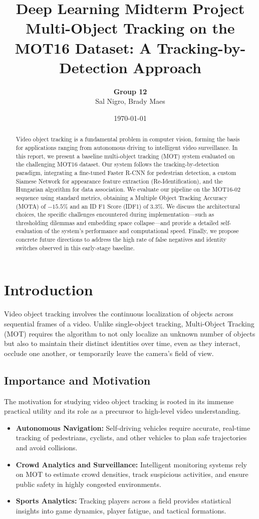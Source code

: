 \documentclass[11pt, letterpaper]{article}
\title{\textbf{Deep Learning Midterm Project}\\Multi-Object Tracking on the MOT16 Dataset: A Tracking-by-Detection Approach}
\author{\textbf{Group 12} \\ Sal Nigro, Brady Maes}
\date{\today}
\begin{document}
\maketitle

\begin{abstract}
Video object tracking is a fundamental problem in computer vision, forming the basis for applications ranging from autonomous driving to intelligent video surveillance. In this report, we present a baseline multi-object tracking (MOT) system evaluated on the challenging MOT16 dataset. Our system follows the tracking-by-detection paradigm, integrating a fine-tuned Faster R-CNN for pedestrian detection, a custom Siamese Network for appearance feature extraction (Re-Identification), and the Hungarian algorithm for data association. We evaluate our pipeline on the MOT16-02 sequence using standard metrics, obtaining a Multiple Object Tracking Accuracy (MOTA) of $-15.5\%$ and an ID F1 Score (IDF1) of $3.3\%$. We discuss the architectural choices, the specific challenges encountered during implementation—such as thresholding dilemmas and embedding space collapse—and provide a detailed self-evaluation of the system's performance and computational speed. Finally, we propose concrete future directions to address the high rate of false negatives and identity switches observed in this early-stage baseline.
\end{abstract}

\section{Introduction}
Video object tracking involves the continuous localization of objects across sequential frames of a video. Unlike single-object tracking, Multi-Object Tracking (MOT) requires the algorithm to not only localize an unknown number of objects but also to maintain their distinct identities over time, even as they interact, occlude one another, or temporarily leave the camera's field of view.

\subsection{Importance and Motivation}
The motivation for studying video object tracking is rooted in its immense practical utility and its role as a precursor to high-level video understanding. 
\begin{itemize}
    \item \textbf{Autonomous Navigation:} Self-driving vehicles require accurate, real-time tracking of pedestrians, cyclists, and other vehicles to plan safe trajectories and avoid collisions.
    \item \textbf{Crowd Analytics and Surveillance:} Intelligent monitoring systems rely on MOT to estimate crowd densities, track suspicious activities, and ensure public safety in highly congested environments.
    \item \textbf{Sports Analytics:} Tracking players across a field provides statistical insights into game dynamics, player fatigue, and tactical formations.
\end{itemize}
\end{document}
